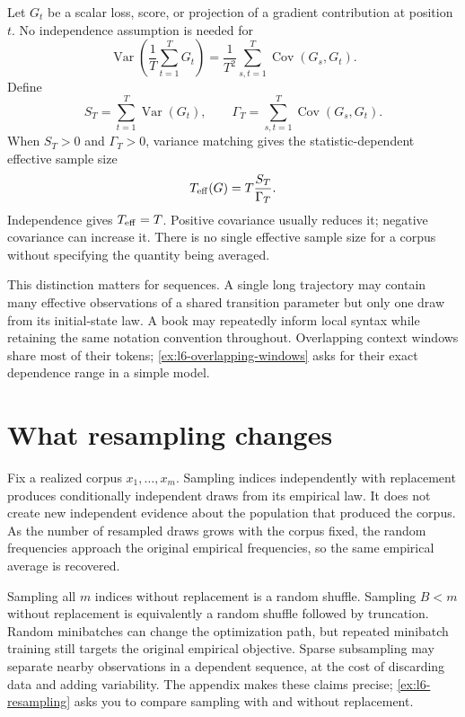 \documentclass[11pt,twoside]{article}
\theoremstyle{definition}
\theoremstyle{remark}
\begin{document}
Let \(G_t\) be a scalar loss, score, or projection of a gradient contribution
at position \(t\). No independence assumption is needed for
\begin{equation}
 \operatorname{Var}\!\left(\frac1T\sum_{t=1}^T G_t\right)
 =\frac1{T^2}\sum_{s,t=1}^T\operatorname{Cov}(G_s,G_t).
 \label{eq:covariance-sum}
\end{equation}
Define
\[
 S_T=\sum_{t=1}^T\operatorname{Var}(G_t),
 \qquad
 \Gamma_T=\sum_{s,t=1}^T\operatorname{Cov}(G_s,G_t).
\]
When \(S_T>0\) and \(\Gamma_T>0\), variance matching gives the
statistic-dependent effective sample size
\begin{equation}
 T_{\rm eff}(G)=T\frac{S_T}{\Gamma_T}.
 \label{eq:general-neff}
\end{equation}
Independence gives \(T_{\rm eff}=T\). Positive covariance usually reduces it;
negative covariance can increase it. There is no single effective sample size
for a corpus without specifying the quantity being averaged.

This distinction matters for sequences. A single long trajectory may contain
many effective observations of a shared transition parameter but only one
draw from its initial-state law. A book may repeatedly inform local syntax
while retaining the same notation convention throughout. Overlapping context
windows share most of their tokens; \cref{ex:l6-overlapping-windows} asks for
their exact dependence range in a simple model.

\section{What resampling changes}
\label{sec:resampling}

Fix a realized corpus \(x_1,\ldots,x_m\). Sampling indices independently with
replacement produces conditionally independent draws from its empirical law.
It does not create new independent evidence about the population that produced
the corpus. As the number of resampled draws grows with the corpus fixed, the
random frequencies approach the original empirical frequencies, so the same
empirical average is recovered.

Sampling all \(m\) indices without replacement is a random shuffle. Sampling
\(B<m\) without replacement is equivalently a random shuffle followed by
truncation. Random minibatches can change the optimization path, but repeated
minibatch training still targets the original empirical objective. Sparse
subsampling may separate nearby observations in a dependent sequence, at the
cost of discarding data and adding variability. The appendix makes these
claims precise; \cref{ex:l6-resampling} asks you to compare sampling with and
without replacement.
\end{document}
